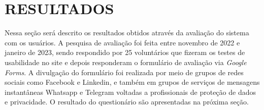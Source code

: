 \documentclass[
	12pt,				%
	openright,			%
	oneside,			%
	a4paper,			%
	english,			%
	french,				%
	spanish,			%
	brazil,				%
	]{abntex2}
\begin{document}
\pagebreak


\chapter{RESULTADOS}
\label{ch: resultados} 

Nessa seção será descrito os resultados obtidos através da avaliação do sistema com os usuários. A pesquisa de avaliação foi feita entre novembro de 2022 e janeiro de 2023, sendo respondido por 25 voluntários que fizeram os testes de usabilidade no site e depois responderam o formulário de avaliação via \textit{Google Forms}. A divulgação do formulário foi realizada por meio de grupos de redes sociais como Facebook e Linkedin, e também em grupos de serviços de mensagens instantâneas Whatsapp e Telegram voltadas a profissionais de proteção de dados e privacidade. O resultado do questionário são apresentadas na próxima seção.
\end{document}

